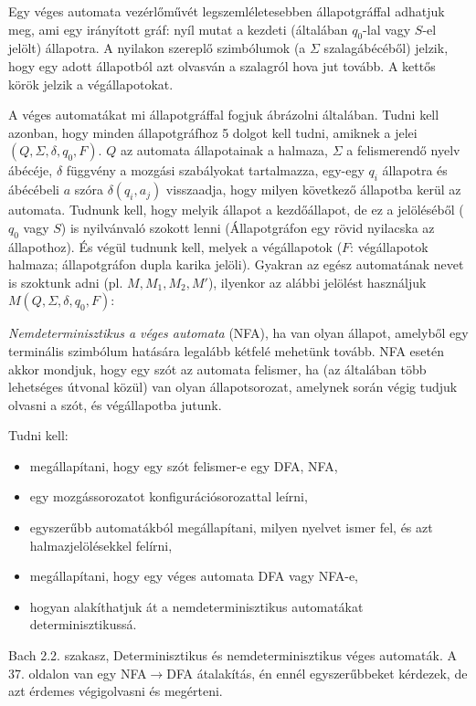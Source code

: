 \documentclass[a4paper]{article}
\begin{document}
Egy véges automata vezérlőművét legszemléletesebben állapotgráffal
adhatjuk meg, ami egy irányított gráf: nyíl mutat a kezdeti (általában
$q_0$-lal vagy $S$-el jelölt) állapotra. A nyilakon szereplő szimbólumok
(a $\Sigma$ szalagábécéből) jelzik, hogy egy adott állapotból azt olvasván a
szalagról hova jut tovább. A kettős körök jelzik a végállapotokat.

A véges automatákat mi állapotgráffal fogjuk ábrázolni általában. Tudni
kell azonban, hogy minden állapotgráfhoz 5 dolgot kell tudni, amiknek a
jelei $(Q, \Sigma, \delta, q_0, F)$. $Q$ az automata állapotainak a
halmaza, $\Sigma$ a felismerendő nyelv ábécéje, $\delta$ függvény a
mozgási szabályokat tartalmazza, egy-egy $q_i$ állapotra és ábécébeli
$a$ szóra $\delta(q_i, a_j)$ visszaadja, hogy milyen következő állapotba
kerül az automata. Tudnunk kell, hogy melyik állapot a kezdőállapot, de
ez a jelöléséből ($q_0$ vagy $S$) is nyilvánvaló szokott lenni
(Állapotgráfon egy rövid nyilacska az állapothoz). És végül tudnunk
kell, melyek a végállapotok ($F$: végállapotok halmaza; állapotgráfon
dupla karika jelöli).  Gyakran az egész automatának nevet is szoktunk
adni (pl. $M, M_1, M_2, M'$), ilyenkor az alábbi jelölést használjuk
$M(Q, \Sigma, \delta, q_0, F)$:

\emph{Nemdeterminisztikus a véges automata} (NFA), ha van olyan állapot,
amelyből egy terminális szimbólum hatására legalább kétfelé mehetünk
tovább.  NFA esetén akkor mondjuk, hogy egy szót az automata felismer,
ha (az általában több lehetséges útvonal közül) van olyan
állapotsorozat, amelynek során végig tudjuk olvasni a szót, és
végállapotba jutunk.

Tudni kell:
\begin{itemize}
\item megállapítani, hogy egy szót felismer-e egy DFA, NFA,
\item egy mozgássorozatot konfigurációsorozattal leírni,
\item egyszerűbb automatákból megállapítani, milyen nyelvet ismer fel,
és azt halmazjelölésekkel felírni,
\item megállapítani, hogy egy véges automata DFA vagy NFA-e,
\item hogyan alakíthatjuk át a nemdeterminisztikus automatákat
determinisztikussá.
\end{itemize}

Bach 2.2. szakasz, Determinisztikus és nemdeterminisztikus véges
automaták. A 37. oldalon van egy NFA$\rightarrow$DFA átalakítás, én
ennél egyszerűbbeket kérdezek, de azt érdemes végigolvasni és megérteni.
\end{document}
